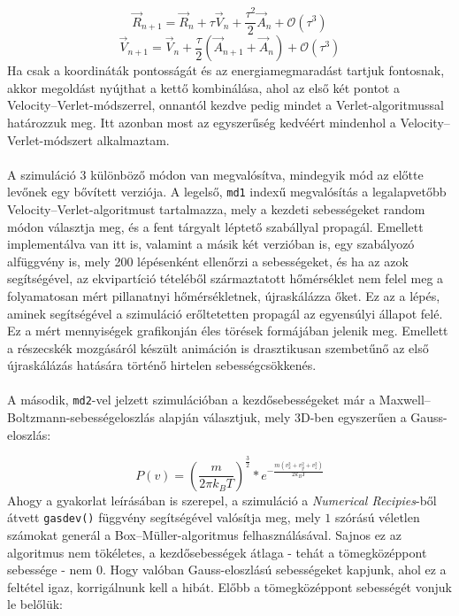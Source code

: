\begin{multicols}{2}
\begin{equation}
    \vec{R}_{n + 1}
    =
    \vec{R}_{n} + \tau \vec{V}_{n} + \frac{\tau^{2}}{2} \vec{A}_{n} + \mathscr{O} \left( \tau^{3} \right)
\end{equation}
\begin{equation}
    \vec{V}_{n + 1}
    =
    \vec{V}_{n} + \frac{\tau}{2} \left( \vec{A}_{n + 1} + \vec{A}_{n} \right) + \mathscr{O} \left( \tau^{3} \right)
\end{equation}
Ha csak a koordináták pontosságát és az energiamegmaradást tartjuk fontosnak, akkor megoldást nyújthat a kettő kombinálása, ahol az első két pontot a Velocity--Verlet-módszerrel, onnantól kezdve pedig mindet a Verlet-algoritmussal határozzuk meg. Itt azonban most az egyszerűség kedvéért mindenhol a Velocity--Verlet-módszert alkalmaztam.
\\ \\
A szimuláció 3 különböző módon van megvalósítva, mindegyik mód az előtte levőnek egy bővített verziója. A legelső, \texttt{md1} indexű megvalósítás a legalapvetőbb Velocity--Verlet-algoritmust tartalmazza, mely a kezdeti sebességeket random módon választja meg, és a fent tárgyalt léptető szabállyal propagál. Emellett implementálva van itt is, valamint a másik két verzióban is, egy szabályozó alfüggvény is, mely 200 lépésenként ellenőrzi a sebességeket, és ha az azok segítségével, az ekvipartíció tételéből származtatott hőmérséklet nem felel meg a folyamatosan mért pillanatnyi hőmérsékletnek, újraskálázza őket. Ez az a lépés, aminek segítségével a szimuláció erőltetetten propagál az egyensúlyi állapot felé. Ez a mért mennyiségek grafikonján éles törések formájában jelenik meg. Emellett a részecskék mozgásáról készült animáción is drasztikusan szembetűnő az első újraskálázás hatására történő hirtelen sebességcsökkenés\cite{yt}.
\\ \\
A második, \texttt{md2}-vel jelzett szimulációban a kezdősebességeket már a Maxwell--Boltzmann-sebességeloszlás alapján választjuk, mely 3D-ben egyszerűen a Gauss-eloszlás:

\begin{equation}
    P \left( v \right)
    =
    \left( \frac{m}{2 \pi k_{B} T} \right)^{\frac{3}{2}}
    *
    e^{- \tfrac{m \left( v_{x}^{2} + v_{y}^{2} + v_{z}^{2} \right)}{2 k_{B} T}}
\end{equation}
Ahogy a gyakorlat leírásában is szerepel\cite{szamszim}, a szimuláció a \textit{Numerical Recipies}-ből átvett \texttt{gasdev()} függvény segítségével valósítja meg, mely $1$ szórású véletlen számokat generál a Box--Müller-algoritmus felhasználásával\cite{press2007numerical}. Sajnos ez az algoritmus nem tökéletes, a kezdősebességek átlaga - tehát a tömegközéppont sebessége - nem 0. Hogy valóban Gauss-eloszlású sebességeket kapjunk, ahol ez a feltétel igaz, korrigálnunk kell a hibát. Előbb a tömegközéppont sebességét vonjuk le belőlük:


\end{multicols}
